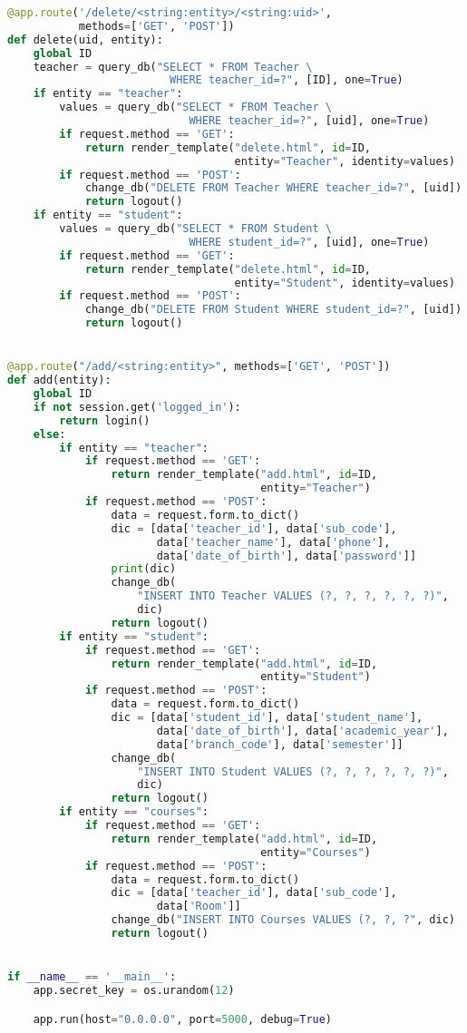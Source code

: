 \begin{lstlisting}[language=python]
@app.route('/delete/<string:entity>/<string:uid>',
           methods=['GET', 'POST'])
def delete(uid, entity):
    global ID
    teacher = query_db("SELECT * FROM Teacher \
                         WHERE teacher_id=?", [ID], one=True)
    if entity == "teacher":
        values = query_db("SELECT * FROM Teacher \
                            WHERE teacher_id=?", [uid], one=True)
        if request.method == 'GET':
            return render_template("delete.html", id=ID,
                                   entity="Teacher", identity=values)
        if request.method == 'POST':
            change_db("DELETE FROM Teacher WHERE teacher_id=?", [uid])
            return logout()
    if entity == "student":
        values = query_db("SELECT * FROM Student \
                            WHERE student_id=?", [uid], one=True)
        if request.method == 'GET':
            return render_template("delete.html", id=ID,
                                   entity="Student", identity=values)
        if request.method == 'POST':
            change_db("DELETE FROM Student WHERE student_id=?", [uid])
            return logout()


@app.route("/add/<string:entity>", methods=['GET', 'POST'])
def add(entity):
    global ID
    if not session.get('logged_in'):
        return login()
    else:
        if entity == "teacher":
            if request.method == 'GET':
                return render_template("add.html", id=ID,
                                       entity="Teacher")
            if request.method == 'POST':
                data = request.form.to_dict()
                dic = [data['teacher_id'], data['sub_code'],
                       data['teacher_name'], data['phone'],
                       data['date_of_birth'], data['password']]
                print(dic)
                change_db(
                    "INSERT INTO Teacher VALUES (?, ?, ?, ?, ?, ?)",
                    dic)
                return logout()
        if entity == "student":
            if request.method == 'GET':
                return render_template("add.html", id=ID,
                                       entity="Student")
            if request.method == 'POST':
                data = request.form.to_dict()
                dic = [data['student_id'], data['student_name'],
                       data['date_of_birth'], data['academic_year'],
                       data['branch_code'], data['semester']]
                change_db(
                    "INSERT INTO Student VALUES (?, ?, ?, ?, ?, ?)",
                    dic)
                return logout()
        if entity == "courses":
            if request.method == 'GET':
                return render_template("add.html", id=ID,
                                       entity="Courses")
            if request.method == 'POST':
                data = request.form.to_dict()
                dic = [data['teacher_id'], data['sub_code'],
                       data['Room']]
                change_db("INSERT INTO Courses VALUES (?, ?, ?", dic)
                return logout()


if __name__ == '__main__':
    app.secret_key = os.urandom(12)

    app.run(host="0.0.0.0", port=5000, debug=True)

\end{lstlisting}
